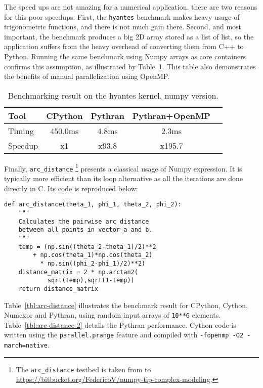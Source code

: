\documentclass[10pt, onecolumn, preprint]{sigplanconf}
\begin{document}
The speed ups are not amazing for a numerical application. there are two
reasons for this poor speedups. First, the \texttt{hyantes} benchmark makes heavy
usage of trigonometric functions, and there is not much gain there. Second, and
most important, the benchmark produces a big 2D array stored as a list of list,
so the application suffers from the heavy overhead of converting them from C++
to Python. Running the same benchmark using Numpy arrays as core containers
confirms this assumption, as illustrated by Table~\ref{tbl:np-hyantes}. This
table also demonstrates the benefits of manual parallelization using OpenMP.


\begin{table}
    \centering

    \begin{tabular}{|l|c|c|c|c|}

        \hline
     Tool    &  CPython    &   Pythran     & Pythran+OpenMP   \\
    \hline
     Timing  &  450.0ms    &   4.8ms       &      2.3ms       \\
    \hline
     Speedup &  x1         &    x93.8      &    x195.7        \\
    \hline
\end{tabular}
\caption{Benchmarking result on the hyantes kernel, numpy version.}
\label{tbl:np-hyantes}
\end{table}

Finally, \texttt{arc\_distance} \footnote{The \texttt{arc\_distance} testbed is taken from to \url{https://bitbucket.org/FedericoV/numpy-tip-complex-modeling}.} presents a classical usage of Numpy expression. It
is typically more efficient than its loop alternative as all the iterations are
done directly in C. Its code is reproduced below:

\begin{lstlisting}
def arc_distance(theta_1, phi_1, theta_2, phi_2):
    """
    Calculates the pairwise arc distance
    between all points in vector a and b.
    """
    temp = (np.sin((theta_2-theta_1)/2)**2
        + np.cos(theta_1)*np.cos(theta_2)
          * np.sin((phi_2-phi_1)/2)**2)
    distance_matrix = 2 * np.arctan2(
            sqrt(temp),sqrt(1-temp))
    return distance_matrix
\end{lstlisting}


Table~\ref{tbl:arc-distance} illustrates the benchmark result for CPython,
Cython, Numexpr and Pythran, using random input arrays of \texttt{10**6} elements.
Table~\ref{tbl:arc-distance-2} details the Pythran performance. Cython code
is written using the \texttt{parallel.prange} feature and compiled with
\texttt{-fopenmp -O2 -march=native}.
\end{document}
